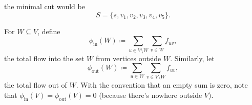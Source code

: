 \documentclass[10pt, a4paper]{article}
\begin{document}
\begin{example}
\begin{solution}
\begin{figure}[H]
        \end{figure}
        the  minimal cut would be
        \[
        S = \{s, v_1, v_2, v_3, v_4, v_5\}.
        \]
    \end{solution}
\end{example}

For $W \subseteq V$,
define
\[
\phi_{\text{in}}(W) \coloneqq \sum_{u \in V \setminus W}\sum_{v \in W}f_{uv},
\]
the total flow into the set $W$ from vertices outside $W$.
Similarly,
let
\[
\phi_{\text{out}}(W) \coloneqq \sum_{u \in W}\sum_{v \in V \setminus W}f_{uv},
\]
the total flow out of $W$.
With the convention that an empty sum is zero,
note that $\phi_{\text{in}}(V) = \phi_{\text{out}}(V) = 0$
(because there's nowhere outside $V$).
\end{document}
